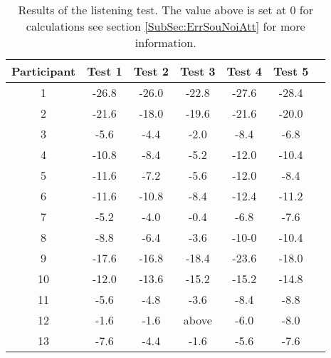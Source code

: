 \begin{table} [H]
	\centering
	\begin{tabular}{*{7}{c}}
		\hline
		Participant & Test 1 & Test 2 & Test 3  & Test 4  & Test 5  
		\\
		\hline
		1 & -26.8 & -26.0 &	-22.8 & -27.6 & -28.4 \\
		2 & -21.6 & -18.0 & -19.6  & -21.6  & -20.0 \\
		3 & -5.6 & -4.4 & -2.0 & -8.4 & -6.8  \\
		4 & -10.8 & -8.4 & -5.2 & -12.0 & -10.4 \\
		5 & -11.6 & -7.2 & -5.6	 & -12.0 & -8.4 \\
		6 & -11.6 & -10.8 & -8.4 & -12.4 & -11.2 \\
		7 & -5.2 & -4.0 & -0.4 & -6.8 & -7.6 \\
		8 & -8.8 & -6.4 & -3.6 & -10-0 & -10.4 \\
		9 & -17.6 & -16.8 & -18.4 & -23.6 & -18.0 \\
		10 & -12.0 & -13.6 & -15.2 & -15.2 & 	-14.8 \\
		11 & -5.6 & -4.8 & -3.6 & -8.4 & -8.8 \\
		12 & -1.6 & -1.6 & above & -6.0 & 	-8.0 \\
		13 & -7.6 & -4.4 & -1.6	 & -5.6 & 	-7.6   \\
		\hline
	\end{tabular}
	\caption{Results of the listening test. The value above is set at 0 for calculations see section \ref{SubSec:ErrSouNoiAtt} for more information.}
	\label{tab:ListeningResults}
\end{table}




